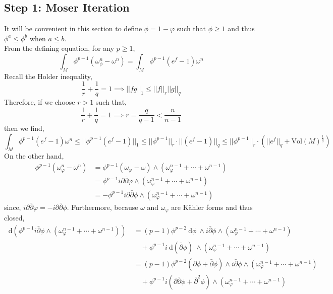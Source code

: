 \documentclass[12pt]{extarticle}
\renewcommand{\d}[1]{\: \mathrm{d}#1 \:}
\theoremstyle{definition}
\newcommand{\Vol}[1]{\mathrm{Vol}\left(#1\right)}
\begin{document}
\subsection{Step 1: Moser Iteration}

It will be convenient in this section to define $\phi = 1 - \varphi$ such that $\phi \ge 1$ and thus $\phi^a \le \phi^b$ when $a \le b$. 
\bigskip\\
From the defining equation, for any $p \ge 1$,
\[ \int_M \phi^{p - 1} (\omega_\phi^n - \omega^n) = \int_M \phi^{p-1} \left( e^f - 1 \right) \omega^n \]
Recall the Holder inequality,
\[ \frac{1}{r} + \frac{1}{q} = 1 \implies || fg ||_1 \le || f ||_r || g ||_q \]
Therefore, if we choose $r > 1$ such that,
\[ \frac{1}{r} + \frac{1}{q} = 1 \implies r = \frac{q}{q - 1} < \frac{n}{n - 1} \]
then we find,
\[ \int_M \phi^{p-1} \left( e^f - 1 \right) \omega^n \le || \phi^{p - 1} (e^f - 1) ||_1 \le || \phi^{p - 1} ||_{r} \cdot  || (e^f - 1) ||_q \le || \phi^{p - 1} ||_r \cdot ( || e^f ||_q + \Vol{M}^{\frac{1}{q}}) \]
On the other hand,
\begin{align*}
\phi^{p - 1} \left( \omega^n_\varphi - \omega^n \right) & = \phi^{p-1} (\omega_\varphi - \omega) \wedge \left( \omega_\varphi^{n-1} + \cdots + \omega^{n - 1} \right)
\\
& = \phi^{p-1} i \partial \bar{\partial} \varphi \wedge \left( \omega_\varphi^{n-1} + \cdots + \omega^{n - 1} \right)
\\
& = - \phi^{p-1} i \partial \bar{\partial} \phi \wedge \left( \omega_\varphi^{n-1} + \cdots + \omega^{n - 1} \right)
\end{align*}
since, $i \partial \bar{\partial} \varphi = - i \partial \bar{\partial} \phi$. Furthermore, because $\omega$ and $\omega_\varphi$ are K\"{a}hler forms and thus closed, 
\begin{align*}
\d{\left(\phi^{p-1} i \bar{\partial} \phi \wedge \left( \omega_\varphi^{n-1} + \cdots + \omega^{n - 1} \right) \right)} & = (p - 1) \phi^{p-2} \d{\phi} \wedge i \bar{\partial} \phi \wedge \left( \omega_\varphi^{n-1} + \cdots + \omega^{n - 1} \right)  
\\
& \quad + \phi^{p-1} i \d{(\bar{\partial} \phi)} \wedge \left( \omega_\varphi^{n-1} + \cdots + \omega^{n - 1} \right) 
\\
& = (p - 1) \phi^{p-2} (\partial \phi + \bar{\partial} \phi) \wedge i \bar{\partial} \phi \wedge \left( \omega_\varphi^{n-1} + \cdots + \omega^{n - 1} \right)  
\\
& \quad + \phi^{p-1} i (\partial \bar{\partial} \phi + \bar{\partial}^2 \phi) \wedge \left( \omega_\varphi^{n-1} + \cdots + \omega^{n - 1} \right) 
\end{align*}
\end{document}
